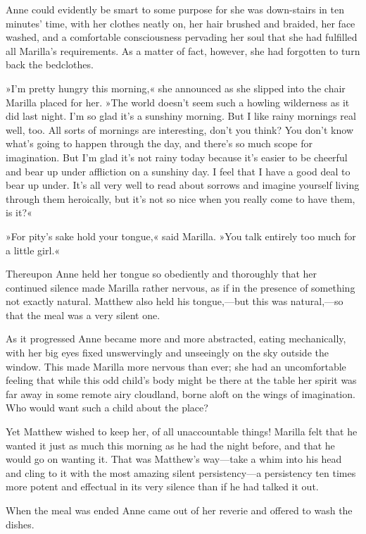 Anne could evidently be smart to some purpose for she was down-stairs in ten minutes’ time, with her clothes neatly on, her hair brushed and braided, her face washed, and a comfortable consciousness pervading her soul that she had fulfilled all Marilla’s requirements. As a matter of fact, however, she had forgotten to turn back the bedclothes.

»I’m pretty hungry this morning,« she announced as she slipped into the chair Marilla placed for her. »The world doesn’t seem such a howling wilderness as it did last night. I’m so glad it’s a sunshiny morning. But I like rainy mornings real well, too. All sorts of mornings are interesting, don’t you think? You don’t know what’s going to happen through the day, and there’s so much scope for imagination. But I’m glad it’s not rainy today because it’s easier to be cheerful and bear up under affliction on a sunshiny day. I feel that I have a good deal to bear up under. It’s all very well to read about sorrows and imagine yourself living through them heroically, but it’s not so nice when you really come to have them, is it?«

»For pity’s sake hold your tongue,« said Marilla. »You talk entirely too much for a little girl.«

Thereupon Anne held her tongue so obediently and thoroughly that her continued silence made Marilla rather nervous, as if in the presence of something not exactly natural. Matthew also held his tongue,—but this was natural,—so that the meal was a very silent one.

As it progressed Anne became more and more abstracted, eating mechanically, with her big eyes fixed unswervingly and unseeingly on the sky outside the window. This made Marilla more nervous than ever; she had an uncomfortable feeling that while this odd child’s body might be there at the table her spirit was far away in some remote airy cloudland, borne aloft on the wings of imagination. Who would want such a child about the place?

Yet Matthew wished to keep her, of all unaccountable things! Marilla felt that he wanted it just as much this morning as he had the night before, and that he would go on wanting it. That was Matthew’s way—take a whim into his head and cling to it with the most amazing silent persistency—a persistency ten times more potent and effectual in its very silence than if he had talked it out.

When the meal was ended Anne came out of her reverie and offered to wash the dishes.

